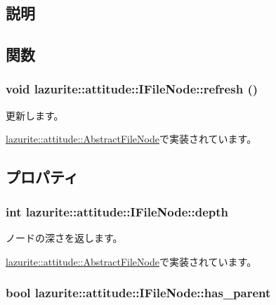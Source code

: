 \subsection{説明}


\subsection{関数}
\hypertarget{interfacelazurite_1_1attitude_1_1_i_file_node_ae6703f58ed2388eafcfce1c5947498e6}{
\subsubsection[{refresh}]{\setlength{\rightskip}{0pt plus 5cm}void lazurite::attitude::IFileNode::refresh ()}}
\label{interfacelazurite_1_1attitude_1_1_i_file_node_ae6703f58ed2388eafcfce1c5947498e6}


更新します。 

\hyperlink{classlazurite_1_1attitude_1_1_abstract_file_node_a78558f5a5aa0b91f8f084fcada9c9e75}{lazurite::attitude::AbstractFileNode}で実装されています。

\subsection{プロパティ}
\hypertarget{interfacelazurite_1_1attitude_1_1_i_file_node_a8904c51913b26cf0299ab565a1226b95}{
\subsubsection[{depth}]{\setlength{\rightskip}{0pt plus 5cm}int lazurite::attitude::IFileNode::depth}}
\label{interfacelazurite_1_1attitude_1_1_i_file_node_a8904c51913b26cf0299ab565a1226b95}


ノードの深さを返します。 

\hyperlink{classlazurite_1_1attitude_1_1_abstract_file_node_a1f0ba501fb7f35eec94d1c5efde04cc9}{lazurite::attitude::AbstractFileNode}で実装されています。\hypertarget{interfacelazurite_1_1attitude_1_1_i_file_node_a564ece8cd8b85bc04bfe7fbe9d9ac0ba}{
\subsubsection[{has\_\-parent}]{\setlength{\rightskip}{0pt plus 5cm}bool lazurite::attitude::IFileNode::has\_\-parent}}
\label{interfacelazurite_1_1attitude_1_1_i_file_node_a564ece8cd8b85bc04bfe7fbe9d9ac0ba}



